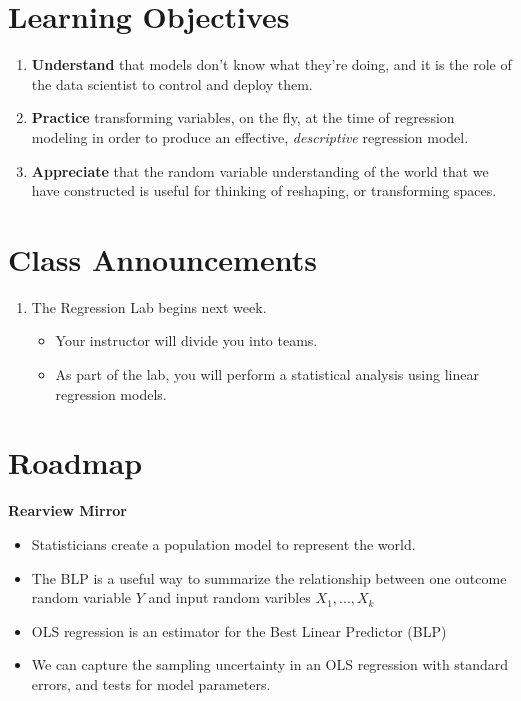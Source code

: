 \documentclass[
  letterpaper,
  DIV=11,
  numbers=noendperiod]{scrreprt}
\providecommand{\tightlist}{%
  \setlength{\itemsep}{0pt}\setlength{\parskip}{0pt}}\usepackage{longtable,booktabs,array}
\begin{document}
\section{Learning Objectives}\label{learning-objectives-9}

\begin{enumerate}
\def\labelenumi{\arabic{enumi}.}
\tightlist
\item
  \textbf{Understand} that models don't know what they're doing, and it
  is the role of the data scientist to control and deploy them.
\item
  \textbf{Practice} transforming variables, on the fly, at the time of
  regression modeling in order to produce an effective,
  \emph{descriptive} regression model.
\item
  \textbf{Appreciate} that the random variable understanding of the
  world that we have constructed is useful for thinking of reshaping, or
  transforming spaces.
\end{enumerate}

\section{Class Announcements}\label{class-announcements-8}

\begin{enumerate}
\def\labelenumi{\arabic{enumi}.}
\tightlist
\item
  The Regression Lab begins next week.

  \begin{itemize}
  \tightlist
  \item
    Your instructor will divide you into teams.
  \item
    As part of the lab, you will perform a statistical analysis using
    linear regression models.
  \end{itemize}
\end{enumerate}

\section{Roadmap}\label{roadmap-6}

\textbf{Rearview Mirror}

\begin{itemize}
\item
  Statisticians create a population model to represent the world.
\item
  The BLP is a useful way to summarize the relationship between one
  outcome random variable \(Y\) and input random varibles
  \(X_1,...,X_k\)
\item
  OLS regression is an estimator for the Best Linear Predictor (BLP)
\item
  We can capture the sampling uncertainty in an OLS regression with
  standard errors, and tests for model parameters.
\end{itemize}
\end{document}
